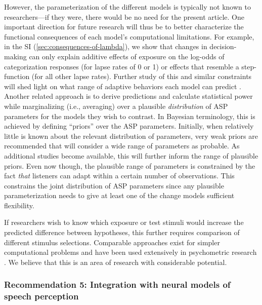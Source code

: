 \documentclass[
  11pt,
  man,floatsintext]{apa6}
\begin{document}
However, the parameterization of the different models is typically not known to researchers---if they were, there would be no need for the present article. One important direction for future research will thus be to better characterize the functional consequences of each model's computational limitations. For example, in the SI (\ref{sec:consequences-of-lambda}), we show that changes in decision-making can only explain additive effects of exposure on the log-odds of categorization responses (for lapse rates of 0 or 1) or effects that resemble a step-function (for all other lapse rates). Further study of this and similar constraints will shed light on what range of adaptive behaviors each model can predict \autocites[for discussions of global, qualitative model comparisons, see][]{pitt2006,apfelbaum-mcmurray2015}. Another related approach is to derive predictions and calculate statistical power while marginalizing (i.e., averaging) over a plausible \emph{distribution} of ASP parameters for the models they wish to contrast. In Bayesian terminology, this is achieved by defining ``priors'' over the ASP parameters. Initially, when relatively little is known about the relevant distribution of parameters, very weak priors are recommended that will consider a wide range of parameters as probable. As additional studies become available, this will further inform the range of plausible priors. Even now though, the plausible range of parameters is constrained by the fact \emph{that} listeners can adapt within a certain number of observations. This constrains the joint distribution of ASP parameters since any plausible parameterization needs to give at least one of the change models sufficient flexibility.

If researchers wish to know which exposure or test stimuli would increase the predicted difference between hypotheses, this further requires comparison of different stimulus selections. Comparable approaches exist for simpler computational problems and have been used extensively in psychometric research \autocites[incl.~online stimulus selection during the experiment, depending on subject-specific performance, e.g.,][]{vul2011,prins2013}. We believe that this is an area of research with considerable potential.

\hypertarget{recommendation-5-integration-with-neural-models-of-speech-perception}{%
\subsubsection{Recommendation 5: Integration with neural models of speech perception}\label{recommendation-5-integration-with-neural-models-of-speech-perception}}
\end{document}
